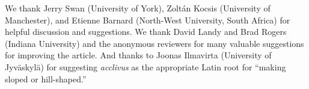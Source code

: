 \documentclass[letterpaper]{article}
\begin{document}
We thank Jerry Swan (University of York), Zolt\'an Kocsis (University of
Manchester), and Etienne Barnard (North-West University, South Africa) for
helpful discussion and suggestions. We thank David Landy and Brad Rogers
(Indiana University) and the anonymous reviewers for many valuable suggestions
for improving the article. And thanks to Joonas Ilmavirta (University of
Jyv\"askyl\"a) for suggesting \textit{acclivus} as the appropriate Latin root
for ``making sloped or hill-shaped.''


\end{document}
